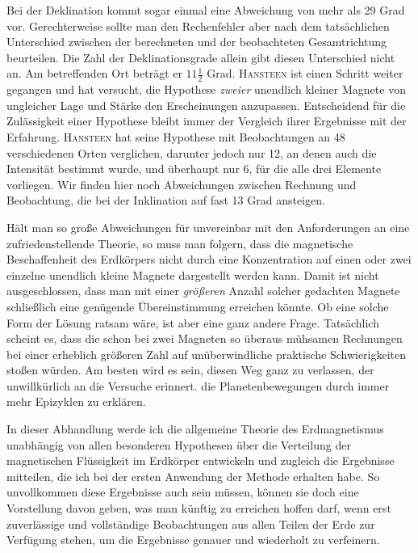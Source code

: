 \expandafter\def\csname HistoricalNoteText14\endcsname{Bei der Deklination kommt sogar einmal eine Abweichung von mehr als 29 Grad vor. Gerechterweise sollte man den Rechenfehler aber nach dem tatsächlichen Unterschied zwischen der berechneten und der beobachteten Gesamtrichtung beurteilen. Die Zahl der Deklinationsgrade allein gibt diesen Unterschied nicht an. Am betreffenden Ort beträgt er $11\frac{1}{2}$ Grad.}
\textsc{Hansteen} ist einen Schritt weiter gegangen und hat versucht, die Hypothese \textit{zweier} unendlich kleiner Magnete von ungleicher Lage und Stärke den Erscheinungen anzupassen. Entscheidend für die Zulässigkeit einer Hypothese bleibt immer der Vergleich ihrer Ergebnisse mit der Erfahrung. \textsc{Hansteen} hat seine Hypothese mit Beobachtungen an 48 verschiedenen Orten verglichen, darunter jedoch nur 12, an denen auch die Intensität bestimmt wurde, und überhaupt nur 6, für die alle drei Elemente vorliegen. Wir finden hier noch Abweichungen zwischen Rechnung und Beobachtung, die bei der Inklination auf fast 13 Grad ansteigen.

Hält man so große Abweichungen für unvereinbar mit den Anforderungen an eine zufriedenstellende Theorie, so muss man folgern, dass die magnetische Beschaffenheit des Erdkörpers nicht durch eine Konzentration auf einen oder zwei einzelne unendlich kleine Magnete dargestellt werden kann. Damit ist nicht ausgeschlossen, dass man mit einer \textit{größeren} Anzahl solcher gedachten Magnete schließlich eine genügende Übereinstimmung erreichen könnte. Ob eine solche Form der Lösung ratsam wäre, ist aber eine ganz andere Frage. Tatsächlich scheint es, dass die schon bei zwei Magneten so überaus mühsamen Rechnungen bei einer erheblich größeren Zahl auf unüberwindliche praktische Schwierigkeiten stoßen würden. Am besten wird es sein, diesen Weg ganz zu verlassen, der unwillkürlich an die Versuche erinnert. die Planetenbewegungen durch immer mehr Epizyklen zu erklären.

In dieser Abhandlung werde ich die allgemeine Theorie des Erdmagnetismus unabhängig von allen besonderen Hypothesen über die Verteilung der magnetischen Flüssigkeit im Erdkörper entwickeln und zugleich die Ergebnisse mitteilen, die ich bei der ersten Anwendung der Methode erhalten habe. So unvollkommen diese Ergebnisse auch sein müssen, können sie doch eine Vorstellung davon geben, was man künftig zu erreichen hoffen darf, wenn erst zuverlässige und vollständige Beobachtungen aus allen Teilen der Erde zur Verfügung stehen, um die Ergebnisse genauer und wiederholt zu verfeinern.

